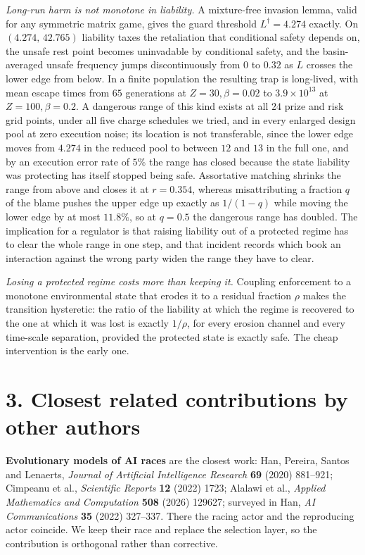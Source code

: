 \documentclass[10pt,a4paper]{article}
\begin{document}
\emph{Long-run harm is not monotone in liability.} A mixture-free invasion
lemma, valid for any symmetric matrix game, gives the guard threshold
$L^{\dagger}=4.274$ exactly. On $(4.274,\,42.765)$ liability taxes the
retaliation that conditional safety depends on, the unsafe rest point becomes
uninvadable by conditional safety, and the basin-averaged unsafe frequency
jumps discontinuously from $0$ to $0.32$ as $L$ crosses the lower edge from
below. In a finite population the resulting trap is long-lived, with mean
escape times from $65$ generations at $Z=30,\beta=0.02$ to
$3.9\times10^{13}$ at $Z=100,\beta=0.2$. A dangerous range of this kind exists
at all $24$ prize and risk grid points, under all five charge schedules we
tried, and in every enlarged design pool at zero execution noise; its location
is not transferable, since the lower edge moves from $4.274$ in the reduced
pool to between $12$ and $13$ in the full one, and by an execution error rate
of $5\%$ the range has closed because the state liability was protecting has
itself stopped being safe. Assortative matching shrinks the range from above
and closes it at $r=0.354$, whereas misattributing a fraction $q$ of the blame
pushes the upper edge up exactly as $1/(1-q)$ while moving the lower edge by at
most $11.8\%$, so at $q=0.5$ the dangerous range has doubled. The implication
for a regulator is that raising liability out of a protected regime has to
clear the whole range in one step, and that incident records which book an
interaction against the wrong party widen the range they have to clear.

\emph{Losing a protected regime costs more than keeping it.} Coupling
enforcement to a monotone environmental state that erodes it to a residual
fraction $\rho$ makes the transition hysteretic: the ratio of the liability at
which the regime is recovered to the one at which it was lost is exactly
$1/\rho$, for every erosion channel and every time-scale separation, provided
the protected state is exactly safe. The cheap intervention is the early one.

\section*{3. Closest related contributions by other authors}

\textbf{Evolutionary models of AI races} are the closest work: Han, Pereira,
Santos and Lenaerts, \emph{Journal of Artificial Intelligence Research}
\textbf{69} (2020) 881--921; Cimpeanu et al., \emph{Scientific Reports}
\textbf{12} (2022) 1723; Alalawi et al., \emph{Applied Mathematics and
Computation} \textbf{508} (2026) 129627; surveyed in Han, \emph{AI
Communications} \textbf{35} (2022) 327--337. There the racing actor and the
reproducing actor coincide. We keep their race and replace the selection layer,
so the contribution is orthogonal rather than corrective.
\end{document}
